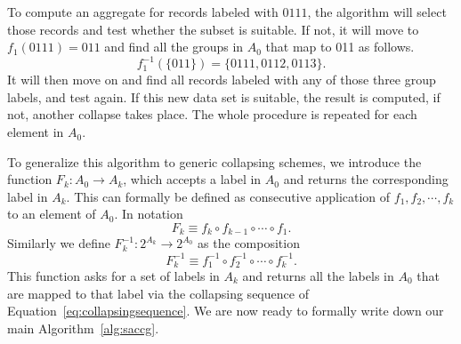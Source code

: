\documentclass[11pt, fleqn]{article}
\begin{document}
To compute an aggregate for records labeled with $0111$, the algorithm will
select those records and test whether the subset is suitable. If not, it will
move to $f_1(0111)=011$ and find all the groups in $A_0$ that map to 011 as
follows.
\begin{displaymath}
f_1^{-1}(\{011\}) = \{0111, 0112, 0113\}.
\end{displaymath}
It will then move on and find all records labeled with any of those three
group labels, and test again. If this new data set is suitable, the result is
computed, if not, another collapse takes place. The whole procedure is repeated 
for each element in $A_0$.




To generalize this algorithm to generic collapsing schemes, we introduce
the function $F_k:A_0\to A_k$, which accepts a label in $A_0$ and 
returns the corresponding label in $A_k$. This can formally be defined 
as consecutive application of $f_1, f_2,\cdots, f_k$ to an element of 
$A_0$. In notation
\begin{equation*}
F_k \equiv f_k\circ f_{k-1}\circ\cdots\circ f_1.
\end{equation*}
Similarly we define $F^{-1}_k:2^{A_k}\to 2^{A_0}$ as the composition
\begin{equation*}
F_k^{-1} \equiv f_1^{-1}\circ f_2^{-1}\circ\cdots\circ f_k^{-1}.
\end{equation*}
This function asks for a set of labels in $A_k$ and returns all the labels in
$A_0$ that are mapped to that label via the collapsing sequence of
Equation~\eqref{eq:collapsingsequence}.  We are now ready to formally
write down our main Algorithm~\ref{alg:saccg}.
\end{document}

